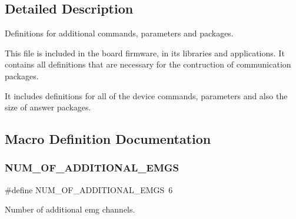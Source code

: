\subsection{Detailed Description}
Definitions for additional commands, parameters and packages. 

This file is included in the board firmware, in its libraries and applications. It contains all definitions that are necessary for the contruction of communication packages.

It includes definitions for all of the device commands, parameters and also the size of answer packages. 

\subsection{Macro Definition Documentation}
\mbox{\label{cp__commands_8h_acfef2d9600a7535f4ad258c2370dd9fa}} 
\subsubsection{N\+U\+M\+\_\+\+O\+F\+\_\+\+A\+D\+D\+I\+T\+I\+O\+N\+A\+L\+\_\+\+E\+M\+GS}
{\footnotesize\ttfamily \#define N\+U\+M\+\_\+\+O\+F\+\_\+\+A\+D\+D\+I\+T\+I\+O\+N\+A\+L\+\_\+\+E\+M\+GS~6}

Number of additional emg channels. 